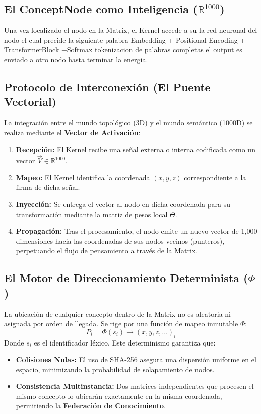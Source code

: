\documentclass[12pt]{article}
\begin{document}
\subsection{El ConceptNode como Inteligencia ($\mathbb{R}^{1000}$)}
Una vez localizado el nodo en la Matrix, el Kernel accede a su la red neuronal del nodo
el cual precide la siguiente palabra Embedding + Positional Encoding + TransformerBlock +Softmax  tokenizacion de palabras completas
el output es enviado a otro nodo hasta terminar la energia.

\subsection{Protocolo de Interconexión (El Puente Vectorial)}
La integración entre el mundo topológico (3D) y el mundo semántico (1000D) se realiza mediante el \textbf{Vector de Activación}:

\begin{enumerate}
	\item \textbf{Recepción:} El Kernel recibe una señal externa o interna codificada como un vector $\vec{V} \in \mathbb{R}^{1000}$.
	\item \textbf{Mapeo:} El Kernel identifica la coordenada $(x, y, z)$ correspondiente a la firma de dicha señal.
	\item \textbf{Inyección:} Se entrega el vector al nodo en dicha coordenada para su transformación mediante la matriz de pesos local $\Theta$.
	\item \textbf{Propagación:} Tras el procesamiento, el nodo emite un nuevo vector de 1,000 dimensiones hacia las coordenadas de sus nodos vecinos (punteros), perpetuando el flujo de pensamiento a través de la Matrix.
\end{enumerate}



\subsection{El Motor de Direccionamiento Determinista ($\Phi$)}
La ubicación de cualquier concepto dentro de la Matrix no es aleatoria ni asignada por orden de llegada. Se rige por una función de mapeo inmutable $\Phi$:
\begin{equation}
	P_i = \Phi(s_i) \to (x, y, z, \dots)_i
\end{equation}
Donde $s_i$ es el identificador léxico. Este determinismo garantiza que:
\begin{itemize}
	\item \textbf{Colisiones Nulas:} El uso de SHA-256 asegura una dispersión uniforme en el espacio, minimizando la probabilidad de solapamiento de nodos.
	\item \textbf{Consistencia Multinstancia:} Dos matrices independientes que procesen el mismo concepto lo ubicarán exactamente en la misma coordenada, permitiendo la \textbf{Federación de Conocimiento}.
\end{itemize}
\end{document}
